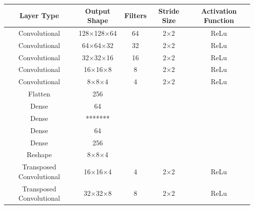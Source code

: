 \documentclass[12pt, onecolumn]{article}
\begin{document}
        \begin{table}[H]
            \centering

            \begin{tabular}{c c c c c}
                
                Layer Type & Output Shape & Filters & Stride Size & Activation Function  \\
    
                \hline
                
                Convolutional & 128$\times$128$\times$64 & 64 & 2$\times$2 & ReLu \\
    
                Convolutional & 64$\times$64$\times$32 & 32 & 2$\times$2 & ReLu \\
    
                Convolutional & 32$\times$32$\times$16 & 16 & 2$\times$2 & ReLu \\
    
                Convolutional & 16$\times$16$\times$8 & 8 & 2$\times$2 & ReLu \\
    
                Convolutional & 8$\times$8$\times$4 & 4 & 2$\times$2 & ReLu \\
    
                Flatten & 256 & & & \\

                Dense & 64 & & & \\
                
                Dense & ******* & & & \\
    
                \hline
    
                Dense & 64 & & & \\
    
                Dense & 256 & & & \\
    
                Reshape & 8$\times$8$\times$4 & & & \\
    
                Transposed Convolutional & 16$\times$16$\times$4 & 4 & 2$\times$2 & ReLu \\
    
                Transposed Convolutional & 32$\times$32$\times$8 & 8 & 2$\times$2 & ReLu \\
    

\end{tabular}
\end{table}
\end{document}
